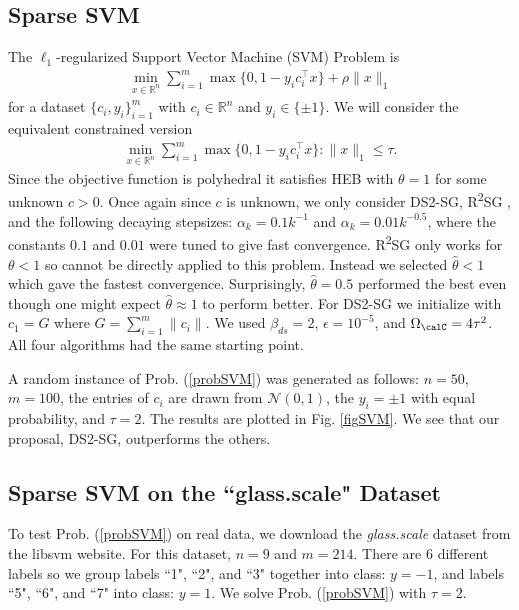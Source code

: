 \subsection{Sparse SVM}
The $\ell_1$-regularized Support Vector Machine (SVM) Problem \cite{zhu20031} is
\begin{eqnarray*}
	\min_{x\in\mathbb{R}^n}\sum_{i=1}^m \max\{0,1- y_i c_i^\top x\}  +\rho\|x\|_1
\end{eqnarray*}
for a dataset $\{c_i,y_i\}_{i=1}^m$ with $c_i\in\mathbb{R}^n$ and $y_i\in\{\pm 1\}$. We will consider the equivalent constrained version
\begin{eqnarray}\label{probSVM}
\min_{x\in\mathbb{R}^n}\sum_{i=1}^m \max\{0,1- y_i c_i^\top x\} : \|x\|_1\leq\tau.
\end{eqnarray}
Since the objective function is polyhedral it satisfies HEB with $\theta=1$ for some unknown $c>0$. Once again since $c$ is unknown, we only consider DS2-SG, R\textsuperscript{2}SG \cite{yang2015rsg}, and the following decaying stepsizes: $\alpha_k=0.1 k^{-1}$ and $\alpha_k=0.01 k^{-0.5}$, where the constants $0.1$ and $0.01$ were tuned to give fast convergence. R\textsuperscript{2}SG only works for $\theta<1$ so cannot be directly applied to this problem. Instead we selected $\hat{\theta}<1$ which gave the fastest convergence. Surprisingly, $\hat{\theta}=0.5$ performed the best even though one might expect $\hat{\theta}\approx 1$ to perform better. For DS2-SG we initialize with $c_1=G$ where $G=\sum_{i=1}^m\|c_i\|$. We used $\beta_{ds}=2$, $\epsilon=10^{-5}$, and $\Omega_{\calC}=4\tau^2$. All four algorithms had the same starting point. 

A random instance of Prob. (\ref{probSVM}) was generated as follows: $n=50$, $m=100$, the entries of $c_i$ are drawn from $\mathcal{N}(0,1)$, the $y_i=\pm 1$ with equal probability, and $\tau=2$. The results are plotted in Fig. \ref{figSVM}. We see that our proposal, DS2-SG, outperforms the others. 

\subsection{Sparse SVM on the ``glass.scale" Dataset}
To test Prob. (\ref{probSVM}) on real data, we download the \emph{glass.scale} dataset from the libsvm website. For this dataset, $n=9$ and $m=214$. There are $6$ different labels so we group labels ``1", ``2", and ``3" together into class: $y=-1$, and labels ``5", ``6", and ``7" into class: $y=1$. We solve Prob. (\ref{probSVM})  with $\tau=2$. 

